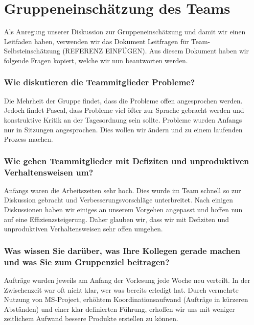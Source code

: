 \chapter{Gruppeneinschätzung des Teams}\label{Gruppenteameinschätzung}

Als Anregung unserer Diskussion zur Gruppeneinschätzung und damit wir einen Leitfaden haben, verwenden wir das Dokument Leitfragen für Team-Selbsteinschätzung (REFERENZ EINFÜGEN). Aus diesem Dokument haben wir folgende Fragen kopiert, welche wir nun beantworten werden.
  
\subsection*{Wie diskutieren die Teammitglieder Probleme?}

Die Mehrheit der Gruppe findet, dass die Probleme offen angesprochen werden. Jedoch findet Pascal, dass Probleme viel öfter zur Sprache gebracht werden und konstruktive Kritik an der Tagesordnung sein sollte. 
Probleme wurden Anfangs nur in Sitzungen angesprochen. Dies wollen wir ändern und zu einem laufenden Prozess machen. 

\subsection*{Wie gehen Teammitglieder mit Defiziten und unproduktiven Verhaltensweisen um?}

Anfangs waren die Arbeitszeiten sehr hoch. Dies wurde im Team schnell so zur Diskussion gebracht und Verbesserungsvorschläge unterbreitet. Nach einigen Diskussionen haben wir einiges an unserem Vorgehen angepasst und hoffen nun auf eine Effizienzsteigerung. Daher glauben wir, dass wir mit Defiziten und unproduktiven Verhaltensweisen sehr offen umgehen.

\subsection*{Was wissen Sie darüber, was Ihre Kollegen gerade machen und was Sie zum
Gruppenziel beitragen?}

Aufträge wurden jeweils am Anfang der Vorlesung jede Woche neu verteilt. In der Zwischenzeit war oft nicht klar, wer was bereits erledigt hat. Durch vermehrte Nutzung von MS-Project, erhöhtem Koordinationsaufwand (Aufträge in kürzeren Abständen) und einer klar definierten Führung, erhoffen wir uns mit weniger zeitlichem Aufwand bessere Produkte erstellen zu können.

